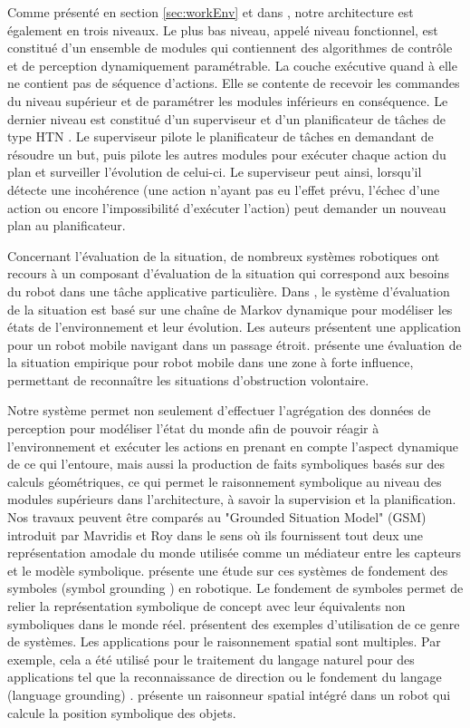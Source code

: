 \documentclass[a4paper,11pt,twoside]{StyleThese}
\begin{document}
Comme présenté en section \ref{sec:workEnv} et dans \cite{Alami1998}, notre architecture est également en trois niveaux. Le plus bas niveau, appelé niveau fonctionnel, est constitué d'un ensemble de modules qui contiennent des algorithmes de contrôle et de perception dynamiquement paramétrable.
La couche exécutive quand à elle ne contient pas de séquence d'actions. Elle se contente de recevoir les commandes du niveau supérieur et de paramétrer les modules inférieurs en conséquence. Le dernier niveau est constitué d'un superviseur \cite{fioreiser2014} et d'un planificateur de tâches de type HTN \cite{Guitton2012}. Le superviseur pilote le planificateur de tâches en demandant de résoudre un but, puis pilote les autres modules pour exécuter chaque action du plan et surveiller l'évolution de celui-ci.
Le superviseur peut ainsi, lorsqu'il détecte une incohérence (une action n'ayant pas eu l'effet prévu, l'échec d'une action ou encore l'impossibilité d'exécuter l'action) peut demander un nouveau plan au planificateur. 


Concernant l'évaluation de la situation, de nombreux systèmes robotiques ont recours à un composant d'évaluation de la situation qui correspond aux besoins du robot dans une tâche applicative particulière. Dans \cite{beck2011}, le système d'évaluation de la situation est basé sur une chaîne de Markov dynamique pour modéliser les états de l'environnement et leur évolution. Les auteurs présentent une application pour un robot mobile navigant dans un passage étroit.
\cite{Kluge01situationassessment} présente une évaluation de la situation empirique pour robot mobile dans une zone à forte influence, permettant de reconnaître les situations d'obstruction volontaire.

Notre système permet non seulement d'effectuer l'agrégation des données de perception pour modéliser l'état du monde afin de pouvoir réagir à l'environnement et exécuter les actions en prenant en compte l'aspect dynamique de ce qui l'entoure, mais aussi la production de faits symboliques basés sur des calculs géométriques, ce qui permet le raisonnement symbolique au niveau des modules supérieurs dans l'architecture, à savoir la supervision et la planification.
Nos travaux peuvent être comparés au "Grounded Situation Model" (GSM) introduit par Mavridis et Roy \cite{Mavridis2005} dans le sens où ils fournissent tout deux une représentation amodale du monde utilisée comme un médiateur entre les capteurs et le modèle symbolique. 
\cite{Coradeschi2013} présente une étude sur ces systèmes de fondement des symboles (symbol grounding \cite{harnad1990symbol}) en robotique.
Le fondement de symboles permet de relier la représentation symbolique de concept avec leur équivalents non symboliques dans le monde réel.
\cite{Daoutis2009} \cite{Lemaignan2011}
présentent des exemples d'utilisation de ce genre de systèmes.
Les applications pour le raisonnement spatial \cite{OKeefe1999} sont multiples. Par exemple, cela a été utilisé pour le traitement du langage naturel pour des applications tel que la reconnaissance de direction \cite{Kollar10,Matuszek10}
ou le fondement du langage (language grounding) \cite{Tellex10}. \cite{Skubic2004} présente un raisonneur spatial intégré dans un robot qui calcule la position symbolique des objets.
\end{document}
